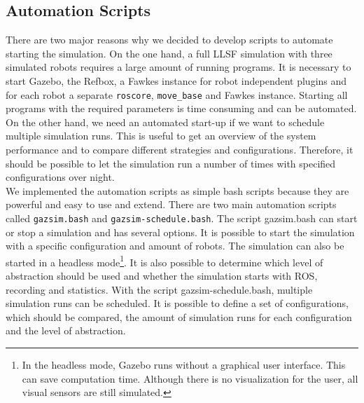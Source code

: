 \subsection{Automation Scripts}
There are two major reasons why we decided to develop scripts to automate starting the simulation. On the one hand, a full LLSF simulation with three simulated robots requires a large amount of running programs. It is necessary to start Gazebo, the Refbox, a Fawkes instance for robot independent plugins and for each robot a separate \texttt{roscore}, \texttt{move\_base} and Fawkes instance. Starting all programs with the required parameters is time consuming and can be automated. On the other hand, we need an automated start-up if we want to schedule multiple simulation runs. This is useful to get an overview of the system performance and to compare different strategies and configurations. Therefore, it should be possible to let the simulation run a number of times with specified configurations over night.\\
We implemented the automation scripts as simple bash scripts because they are powerful and easy to use and extend. There are two main automation scripts called \texttt{gazsim.bash} and \texttt{gazsim-schedule.bash}. The script gazsim.bash can start or stop a simulation and has several options. It is possible to start the simulation with a specific configuration and amount of robots. The simulation can also be started in a headless mode\footnote{In the headless mode, Gazebo runs without a graphical user interface. This can save computation time. Although there is no visualization for the user, all visual sensors are still simulated.}. It is also possible to determine which level of abstraction should be used and whether the simulation starts with ROS, recording and statistics. With the script gazsim-schedule.bash, multiple simulation runs can be scheduled. It is possible to define a set of configurations, which should be compared, the amount of simulation runs for each configuration and the level of abstraction.



